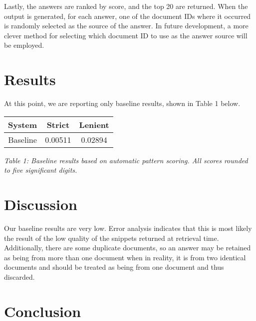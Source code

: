\documentclass[11pt]{article}
\begin{document}
Lastly, the answers are ranked by score, and the top 20 are returned.  When the output is generated, for each answer, one of the document IDs where it occurred is randomly selected as the source of the answer.  In future development, a more clever method for selecting which document ID to use as the answer source will be employed.

\section{Results}

At this point, we are reporting only baseline results, shown in Table 1 below.

\vspace{5mm}
{\centering
\begin{tabular}{|c|c|c|}
\hline
\textbf{System} & \textbf{Strict} & \textbf{Lenient} \\ \hline
Baseline & 0.00511 & 0.02894 \\ \hline
\end{tabular}

\vspace{1mm}
\emph{Table 1: Baseline results based on automatic pattern scoring. All scores rounded to five significant digits.}
\par}

\section{Discussion}

Our baseline results are very low.  Error analysis indicates that this is most likely the result of the low quality of the snippets returned at retrieval time.  Additionally, there are some duplicate documents, so an answer may be retained as being from more than one document when in reality, it is from two identical documents and should be treated as being from one document and thus discarded.

\section{Conclusion}

\nocite{*}




\end{document}
